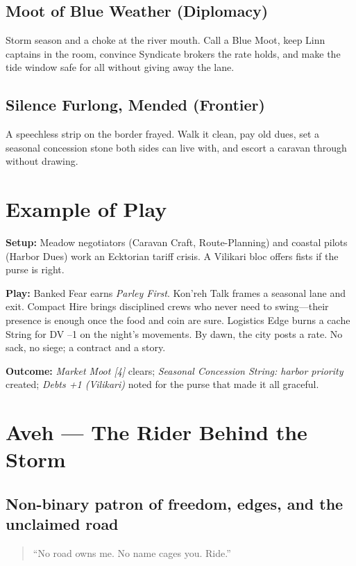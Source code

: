 \documentclass[11pt,letterpaper]{article}
\begin{document}
\subsection*{Moot of Blue Weather (Diplomacy)}
Storm season and a choke at the river mouth. Call a Blue Moot, keep Linn captains in the room, convince Syndicate brokers the rate holds, and make the tide window safe for all without giving away the lane.

\subsection*{Silence Furlong, Mended (Frontier)}
A speechless strip on the border frayed. Walk it clean, pay old dues, set a seasonal concession stone both sides can live with, and escort a caravan through without drawing.

\section{Example of Play}
\textbf{Setup:} Meadow negotiators (Caravan Craft, Route-Planning) and coastal pilots (Harbor Dues) work an Ecktorian tariff crisis. A Vilikari bloc offers fists if the purse is right.

\textbf{Play:} Banked Fear earns \emph{Parley First}. Kon'reh Talk frames a seasonal lane and exit. Compact Hire brings disciplined crews who never need to swing---their presence is enough once the food and coin are sure. Logistics Edge burns a cache String for DV --1 on the night's movements. By dawn, the city posts a rate. No sack, no siege; a contract and a story.

\textbf{Outcome:} \emph{Market Moot [4]} clears; \emph{Seasonal Concession String: harbor priority} created; \emph{Debts +1 (Vilikari)} noted for the purse that made it all graceful.

\section{Aveh --- The Rider Behind the Storm}

\subsection*{Non-binary patron of freedom, edges, and the unclaimed road}

\begin{quote}
``No road owns me. No name cages you. Ride.''
\end{quote}
\end{document}
